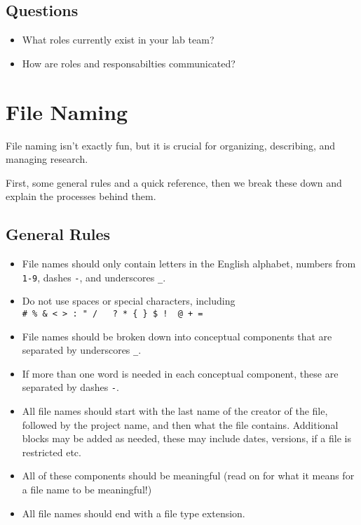 \documentclass[
]{book}
\providecommand{\tightlist}{%
  \setlength{\itemsep}{0pt}\setlength{\parskip}{0pt}}
\begin{document}
\hypertarget{questions}{%
\section*{Questions}\label{questions}}

\begin{itemize}
\tightlist
\item
  What roles currently exist in your lab team?
\item
  How are roles and responsabilties communicated?
\end{itemize}

\hypertarget{file-naming-1}{%
\chapter*{File Naming}\label{file-naming-1}}

File naming isn't exactly fun, but it is crucial for organizing, describing, and managing research.

First, some general rules and a quick reference, then we break these down and explain the processes behind them.

\hypertarget{general-rules-1}{%
\section*{General Rules}\label{general-rules-1}}

\begin{itemize}
\tightlist
\item
  File names should only contain letters in the English alphabet, numbers from \texttt{1-9}, dashes \texttt{-}, and underscores \texttt{\_}.
\item
  Do not use spaces or special characters, including \texttt{\#\ \%\ \&\ \textless{}\ \textgreater{}\ :\ "\ /\ \ \textbar{}\ ?\ *\ \{\ \}\ \$\ !\ \textquotesingle{}\ @\ +\ =}
\item
  File names should be broken down into conceptual components that are separated by underscores \texttt{\_}.
\item
  If more than one word is needed in each conceptual component, these are separated by dashes \texttt{-}.
\item
  All file names should start with the last name of the creator of the file, followed by the project name, and then what the file contains. Additional blocks may be added as needed, these may include dates, versions, if a file is restricted etc.
\item
  All of these components should be meaningful (read on for what it means for a file name to be meaningful!)
\item
  All file names should end with a file type extension.
\end{itemize}
\end{document}
